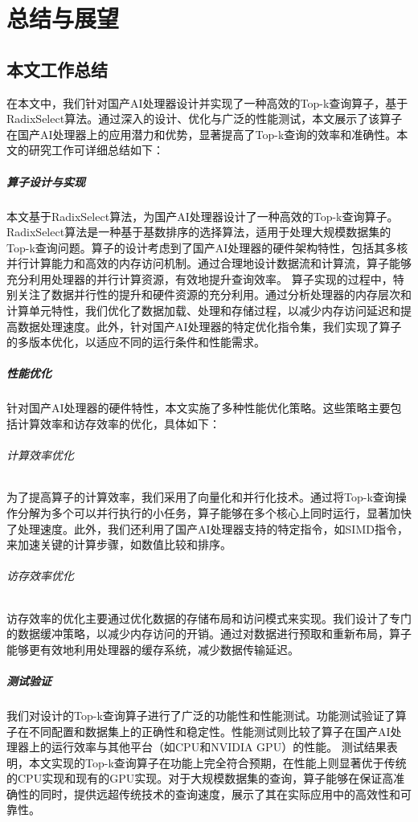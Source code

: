 \chapter{总结与展望}
\section{本文工作总结}
在本文中，我们针对国产AI处理器设计并实现了一种高效的Top-k查询算子，基于RadixSelect算法。通过深入的设计、优化与广泛的性能测试，本文展示了该算子在国产AI处理器上的应用潜力和优势，显著提高了Top-k查询的效率和准确性。本文的研究工作可详细总结如下：
\paragraph{算子设计与实现}

本文基于RadixSelect算法，为国产AI处理器设计了一种高效的Top-k查询算子。RadixSelect算法是一种基于基数排序的选择算法，适用于处理大规模数据集的Top-k查询问题。算子的设计考虑到了国产AI处理器的硬件架构特性，包括其多核并行计算能力和高效的内存访问机制。通过合理地设计数据流和计算流，算子能够充分利用处理器的并行计算资源，有效地提升查询效率。
算子实现的过程中，特别关注了数据并行性的提升和硬件资源的充分利用。通过分析处理器的内存层次和计算单元特性，我们优化了数据加载、处理和存储过程，以减少内存访问延迟和提高数据处理速度。此外，针对国产AI处理器的特定优化指令集，我们实现了算子的多版本优化，以适应不同的运行条件和性能需求。
\paragraph{性能优化}

针对国产AI处理器的硬件特性，本文实施了多种性能优化策略。这些策略主要包括计算效率和访存效率的优化，具体如下：
\subparagraph{计算效率优化}
为了提高算子的计算效率，我们采用了向量化和并行化技术。通过将Top-k查询操作分解为多个可以并行执行的小任务，算子能够在多个核心上同时运行，显著加快了处理速度。此外，我们还利用了国产AI处理器支持的特定指令，如SIMD指令，来加速关键的计算步骤，如数值比较和排序。
\subparagraph{访存效率优化}
访存效率的优化主要通过优化数据的存储布局和访问模式来实现。我们设计了专门的数据缓冲策略，以减少内存访问的开销。通过对数据进行预取和重新布局，算子能够更有效地利用处理器的缓存系统，减少数据传输延迟。


\paragraph{测试验证}
我们对设计的Top-k查询算子进行了广泛的功能性和性能测试。功能测试验证了算子在不同配置和数据集上的正确性和稳定性。性能测试则比较了算子在国产AI处理器上的运行效率与其他平台（如CPU和NVIDIA GPU）的性能。
测试结果表明，本文实现的Top-k查询算子在功能上完全符合预期，在性能上则显著优于传统的CPU实现和现有的GPU实现。对于大规模数据集的查询，算子能够在保证高准确性的同时，提供远超传统技术的查询速度，展示了其在实际应用中的高效性和可靠性。


